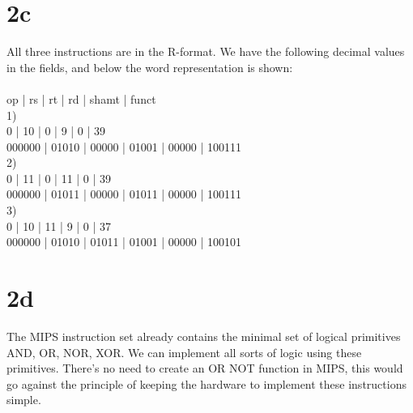 \documentclass[10pt,a4paper]{article}
\begin{document}
\section*{2c}
All three instructions are in the R-format. We have the following decimal values in the fields,
and below the word representation is shown: \\\\
op | rs | rt | rd | shamt | funct \\ 
1) \\ 0 | 10 | 0 | 9 | 0 | 39 \\
000000 | 01010 | 00000 | 01001 | 00000 | 100111 \\ 
2) \\ 0 | 11 | 0 | 11 | 0 | 39 \\
000000 | 01011 | 00000 | 01011 | 00000 | 100111 \\ 
3) \\ 0 | 10 | 11 | 9 | 0 | 37 \\
000000 | 01010 | 01011 | 01001 | 00000 | 100101
\section*{2d}
The MIPS instruction set already contains the minimal set of logical primitives AND, OR, NOR, XOR. We can implement all sorts of logic using these primitives. There's no need to create an OR NOT function in MIPS, this would go against the principle of keeping the hardware to implement these instructions simple.
\end{document}
